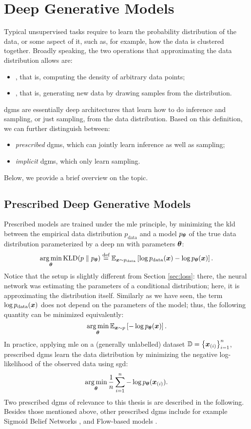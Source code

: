 \section{Deep Generative Models}\label{sec:dgm}
Typical unsupervised tasks require to learn the probability distribution of the data, or some aspect of it, such as, for example, how the data is clustered together. Broadly speaking, the two operations that approximating the data distribution allows are:
\begin{itemize}
    \item {}, that is, computing the density of arbitrary data points;
    \item {}, that is, generating new data by drawing samples from the distribution.
\end{itemize}
\glspl{dgm} \citep{goodfellow2016dl} are essentially deep architectures that learn how to do inference and sampling, or just sampling, from the data distribution. Based on this definition, we can further distinguish between:
\begin{itemize}
    \item \emph{prescribed} \glspl{dgm}, which can jointly learn inference as well as sampling;
    \item \emph{implicit} \glspl{dgm}, which only learn sampling.
\end{itemize}
Below, we provide a brief overview on the topic.

\subsection{Prescribed Deep Generative Models}\label{sec:autoregressive}
Prescribed models are trained under the \gls{mle} principle, by minimizing the \gls{kld} between the empirical data distribution $p_{\mathrm{data}}$ and a model $p_{\boldsymbol{\theta}}$ of the true data distribution parameterized by a deep \gls{nn} with parameters $\boldsymbol{\theta}$:
$$\argmin_{\Param} \KLD{p}{p_{\Param}} \defeq \Expectation{\Vector{x} \sim p_{\mathrm{data}}}{\log p_{\mathrm{data}}(\Vector{x}) -\log p_{\Param}(\Vector{x})}.$$
Notice that the setup is slightly different from Section \ref{sec:loss}: there, the neural network was estimating the parameters of a conditional distribution; here, it is approximating the distribution itself. Similarly as we have seen, the term $\log p_{\mathrm{data}}(\Vector{x})$ does not depend on the parameters of the model; thus, the following quantity can be minimized equivalently:
$$\argmin_{\Param} \Expectation{\Vector{x} \sim p}{-\log p_{\Param}(\Vector{x})}.$$
In practice, applying \gls{mle} on a (generally unlabelled) dataset $\Data = \Set{\PatternVector{x}{i}}_{i=1}^n$, prescribed \glspl{dgm} learn the data distribution by minimizing the negative log-likelihood of the observed data using \gls{sgd}:
$$\argmin_{\Param} \frac{1}{n} \sum_{i=1}^n -\log p_{\Param}(\PatternVector{x}{i}).$$
Two prescribed \glspl{dgm} of relevance to this thesis is are described in the following. Besides those mentioned above, other prescribed \glspl{dgm} include for example Sigmoid Belief Networks \citep{neal1992sigmoidbeliefnet}, and Flow-based models \citep{rezende2015normalizingflows}.

